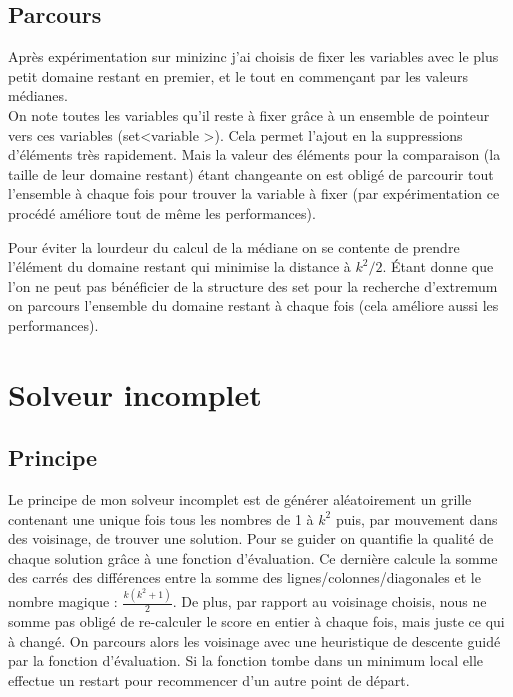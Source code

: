\documentclass[12pt,a4paper]{article}
\begin{document}
\subsection{Parcours}

Après expérimentation sur minizinc j'ai choisis de fixer les variables avec le plus petit domaine restant en premier, et le tout en commençant par les valeurs médianes.\\

On note toutes les variables qu'il reste à fixer grâce à un ensemble de pointeur vers ces variables (set\textless variable \textgreater). Cela permet l’ajout en la suppressions d'éléments très rapidement. Mais la valeur des éléments pour la comparaison (la taille de leur domaine restant) étant changeante on est obligé de parcourir tout l'ensemble à chaque fois pour trouver la variable à fixer (par expérimentation ce procédé améliore tout de même les performances).

Pour éviter la lourdeur du calcul de la médiane on se contente de prendre l’élément du domaine restant qui minimise la distance à $k^2 /2$. Étant donne que l'on ne peut pas bénéficier de la structure des set pour la recherche d’extremum on parcours l'ensemble du domaine restant à chaque fois (cela améliore aussi les performances).

\section{Solveur incomplet}

\subsection{Principe}

Le principe de mon solveur incomplet est de générer aléatoirement un grille contenant une unique fois tous les nombres de 1 à $k^2$ puis, par mouvement dans des voisinage, de trouver une solution.
Pour se guider on quantifie la qualité de chaque solution grâce à une fonction d'évaluation. Ce dernière calcule la somme des carrés des différences entre la somme des lignes/colonnes/diagonales et le nombre magique : $\frac{ k (k^2 +1)}{2}$. De plus, par rapport au voisinage choisis, nous ne somme pas obligé de re-calculer le score en entier à chaque fois, mais juste ce qui à changé.
On parcours alors les voisinage avec une heuristique de descente guidé par la fonction d'évaluation. Si la fonction tombe dans un minimum local elle effectue un restart pour recommencer d'un autre point de départ.\\
\end{document}
